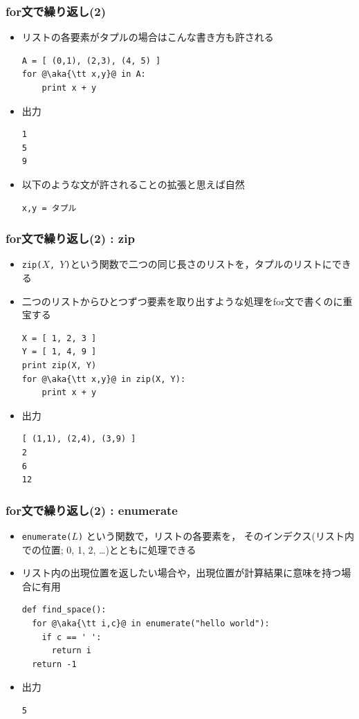 \documentclass[10pt,dvipdfmx]{beamer}
\newcommand{\ao}[1]{{\color{blue}#1}}
\newcommand{\aka}[1]{{\color{red}#1}}
\begin{document}
\begin{frame}[fragile]
\frametitle{for文で繰り返し(2)}
\begin{itemize}
\item リストの各要素がタプルの場合はこんな書き方も許される
\begin{lstlisting}
A = [ (0,1), (2,3), (4, 5) ]
for @\aka{\tt x,y}@ in A:
    print x + y
\end{lstlisting}

\item 出力
\begin{lstlisting}
1
5
9
\end{lstlisting}

\item 以下のような文が許されることの拡張と思えば自然
\begin{lstlisting}
x,y = タプル
\end{lstlisting}
\end{itemize}
\end{frame}


\begin{frame}[fragile]
\frametitle{for文で繰り返し(2) : zip}
\begin{itemize}
\item \ao{\tt zip($X$, $Y$)}という関数で二つの同じ長さのリストを，タプルのリストにできる
\item 二つのリストからひとつずつ要素を取り出すような処理をfor文で書くのに重宝する
\begin{lstlisting}
X = [ 1, 2, 3 ]
Y = [ 1, 4, 9 ]
print zip(X, Y)
for @\aka{\tt x,y}@ in zip(X, Y):
    print x + y
\end{lstlisting}

\item 出力
\begin{lstlisting}
[ (1,1), (2,4), (3,9) ]
2
6
12
\end{lstlisting}
\end{itemize}
\end{frame}

\begin{frame}[fragile]
\frametitle{for文で繰り返し(2) : enumerate}
\begin{itemize}
\item \ao{\tt enumerate($L$)} という関数で，リストの各要素を，
そのインデクス(リスト内での位置; 0, 1, 2, \ldots)とともに処理できる
\item リスト内の出現位置を返したい場合や，出現位置が計算結果に意味を持つ場合に有用
\begin{lstlisting}
def find_space():
  for @\aka{\tt i,c}@ in enumerate("hello world"):
    if c == ' ':
      return i
  return -1
\end{lstlisting}

\item 出力
\begin{lstlisting}
5
\end{lstlisting}
\end{itemize}
\end{frame}
\end{document}
